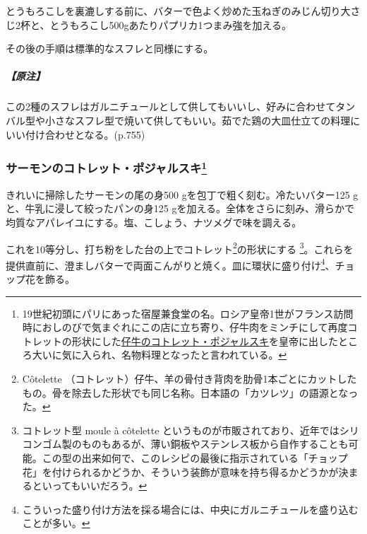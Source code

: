 

とうもろこしを裏漉しする前に、バターで色よく炒めた玉ねぎのみじん切り大さじ2杯と、とうもろこし500gあたりパプリカ1つまみ強を加える。

その後の手順は標準的なスフレと同様にする。

\hypertarget{ux539fux6ce8-1}{%
\subparagraph{【原注】}\label{ux539fux6ce8-1}}

この2種のスフレはガルニチュールとして供してもいいし、好みに合わせてタンバル型や小さなスフレ型で焼いて供してもいい。茹でた鶏の大皿仕立ての料理にいい付け合わせとなる。(p.755)

\hypertarget{cotelettes-de-saumon-pojarski}{%
\subsubsection[サーモンのコトレット・ポジャルスキ]{\texorpdfstring{サーモンのコトレット・ポジャルスキ\footnote{19世紀初頭にパリにあった宿屋兼食堂の名。ロシア皇帝1世がフランス訪問時におしのびで気まぐれにこの店に立ち寄り、仔牛肉をミンチにして再度コトレットの形状にした\protect\hyperlink{cote-de-veau-pojarski}{仔牛のコトレット・ポジャルスキ}を皇帝に出したところ大いに気に入られ、名物料理となったと言われている。}}{サーモンのコトレット・ポジャルスキ}}\label{cotelettes-de-saumon-pojarski}}


きれいに掃除したサーモンの尾の身500 gを包丁で粗く刻む。冷たいバター125
gと、牛乳に浸して絞ったパンの身125
gを加える。全体をさらに刻み、滑らかで均質なアパレイユにする。塩、こしょう、ナツメグで味を調える。

これを10等分し、打ち粉をした台の上でコトレット\footnote{Côtelette
  （コトレット）仔牛、羊の骨付き背肉を肋骨1本ごとにカットしたもの。骨を除去した形状でも同じ名称。日本語の「カツレツ」の語源となった。}の形状にする
\footnote{コトレット型 moule à côtelette
  というものが市販されており、近年ではシリコンゴム製のものもあるが、薄い銅板やステンレス板から自作することも可能。この型の出来如何で、このレシピの最後に指示されている「チョップ花」を付けられるかどうか、そういう装飾が意味を持ち得るかどうかが決まるといってもいいだろう。}。これらを提供直前に、澄ましバターで両面こんがりと焼く。皿に環状に盛り付け\footnote{こういった盛り付け方法を採る場合には、中央にガルニチュールを盛り込むことが多い。}、チョップ花を飾る。

